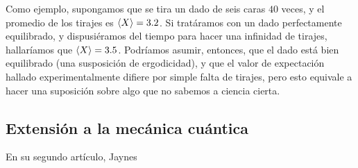 Como ejemplo, supongamos que se tira un dado de seis caras $40$ veces, y el promedio de los tirajes es $\expval{X}=3.2$. Si tratáramos con un dado perfectamente equilibrado, y dispusiéramos del tiempo para hacer una infinidad de tirajes, hallaríamos que $\expval{X}=3.5$. Podríamos asumir, entonces, que el dado está bien equilibrado (una susposición de ergodicidad), y que el valor de expectación hallado experimentalmente difiere por simple falta de tirajes, pero esto equivale a hacer una suposición sobre algo que no sabemos a ciencia cierta.


\subsection{Extensión a la mecánica cuántica}

En su segundo artículo, Jaynes

\newpage